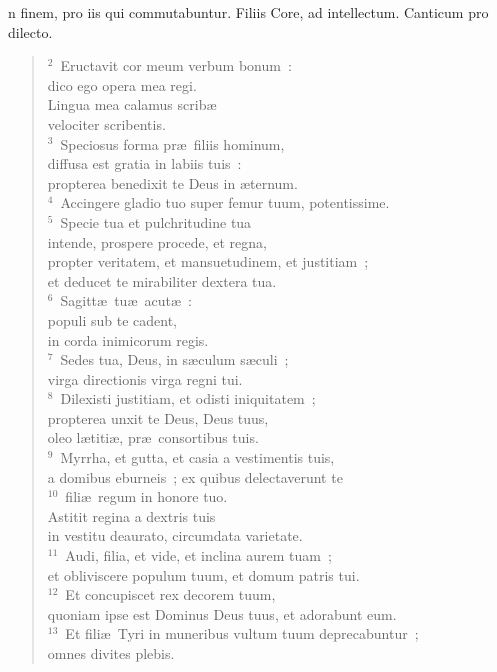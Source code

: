 \bchapter[Psalm]
n finem, pro iis qui commutabuntur. Filiis Core, ad intellectum. Canticum pro dilecto.
\begin{verse}${}^{2}$~Eructavit cor meum verbum bonum~:\\ dico ego opera mea regi.\\ Lingua mea calamus scrib\ae \\ velociter scribentis.\\
${}^{3}$~Speciosus forma pr\ae\ filiis hominum,\\ diffusa est gratia in labiis tuis~:\\ propterea benedixit te Deus in \ae ternum.\\
${}^{4}$~Accingere gladio tuo super femur tuum, potentissime.\\
${}^{5}$~Specie tua et pulchritudine tua\\ intende, prospere procede, et regna,\\ propter veritatem, et mansuetudinem, et justitiam~;\\ et deducet te mirabiliter dextera tua.\\
${}^{6}$~Sagitt\ae\ tu\ae\ acut\ae~:\\ populi sub te cadent,\\ in corda inimicorum regis.\\
${}^{7}$~Sedes tua, Deus, in s\ae culum s\ae culi~;\\ virga directionis virga regni tui.\\
${}^{8}$~Dilexisti justitiam, et odisti iniquitatem~;\\ propterea unxit te Deus, Deus tuus,\\ oleo l\ae titi\ae , pr\ae\ consortibus tuis.\\
${}^{9}$~Myrrha, et gutta, et casia a vestimentis tuis,\\ a domibus eburneis~; ex quibus delectaverunt te\\
${}^{10}$~fili\ae\ regum in honore tuo.\\ Astitit regina a dextris tuis\\ in vestitu deaurato, circumdata varietate.\\
${}^{11}$~Audi, filia, et vide, et inclina aurem tuam~;\\ et obliviscere populum tuum, et domum patris tui.\\
${}^{12}$~Et concupiscet rex decorem tuum,\\ quoniam ipse est Dominus Deus tuus, et adorabunt eum.\\
${}^{13}$~Et fili\ae\ Tyri in muneribus vultum tuum deprecabuntur~;\\ omnes divites plebis.\\

\end{verse}
